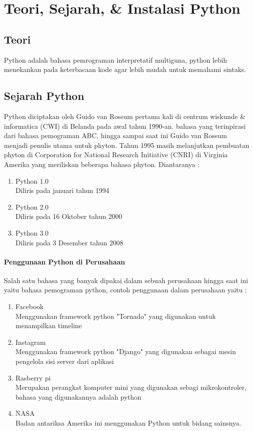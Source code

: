 \chapter{Teori, Sejarah, \& Instalasi Python}
\section{Teori}
Python adalah bahasa pemrograman interpretatif multiguna, python lebih menekankan pada keterbacaan kode agar lebih mudah untuk memahami sintaks.
\section{Sejarah Python}
Python diciptakan oleh Guido van Rossum pertama kali di centrum wiskunde \& informatica (CWI) di Belanda pada awal tahun 1990-an. bahasa yang terinpirasi dari bahasa pemograman ABC, hingga sampai saat ini Guido van Rossum menjadi penulis utama untuk phyton.
Tahun 1995 masih melanjutkan pembuatan phyton di Corporation for National Research Initiative (CNRI) di Virginia Amerika yang meriliskan beberapa bahasa phyton. Diantaranya :
\begin{enumerate}
	\item Python 1.0
	\\ Diliris pada januari tahun 1994
	\item Python 2.0
	\\ Diliris pada 16 Oktober tahun 2000
	\item Python 3.0 
	\\ Diliris pada 3 Desember tahun 2008
\end{enumerate}  
\subsubsection{Penggunaan Python di Perusahaan}
Salah satu bahasa yang banyak dipakai dalam sebuah perusahaan hingga saat ini yaitu bahasa pemograman python,  contoh penggunaan dalam perusahaan yaitu : 
\begin{enumerate}
\item Facebook
\\ Menggunakan framework python "Tornado" yang digunakan untuk menampilkan timeline
\item Instagram 
\\ Menggunakan framework python "Django" yang digunakan sebagai mesin pengelola sisi server dari aplikasi
\item Rasberry pi 
\\ Merupakan perangkat komputer mini yang digunakan sebagi mikrokontroler, bahasa yang digunakannya adalah python
\item NASA
\\ Badan antariksa Amerika ini menggunakan Python untuk bidang sainsnya.
\end{enumerate}
